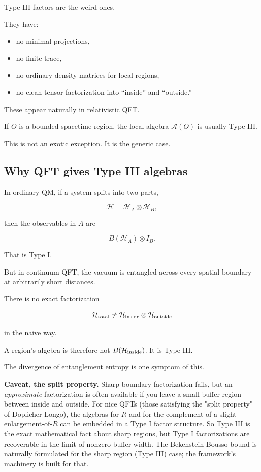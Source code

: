 \documentclass[11pt,a4paper]{article}
\begin{document}
Type III factors are the weird ones.

They have:

\begin{itemize}
  \item no minimal projections,
  \item no finite trace,
  \item no ordinary density matrices for local regions,
  \item no clean tensor factorization into “inside” and “outside.”
\end{itemize}

These appear naturally in relativistic QFT.

If $O$ is a bounded spacetime region, the local algebra $\mathcal{A}(O)$ is usually Type III.

This is not an exotic exception. It is the generic case.

\subsection{Why QFT gives Type III algebras}

In ordinary QM, if a system splits into two parts,

\[
\mathcal{H}=\mathcal{H}_A\otimes\mathcal{H}_B,
\]

then the observables in $A$ are

\[
B(\mathcal{H}_A)\otimes I_B.
\]

That is Type I.

But in continuum QFT, the vacuum is entangled across every spatial boundary at arbitrarily short distances.

There is no exact factorization

\[
\mathcal{H}_{\rm total}
\neq
\mathcal{H}_{\rm inside}\otimes \mathcal{H}_{\rm outside}
\]

in the naive way.

A region's algebra is therefore not $B(\mathcal{H}_{\rm inside})$. It is Type III.

The divergence of entanglement entropy is one symptom of this.

\textbf{Caveat, the split property.} Sharp-boundary factorization fails, but an \emph{approximate} factorization is often available if you leave a small buffer region between inside and outside. For nice QFTs (those satisfying the "split property" of Doplicher-Longo), the algebras for $R$ and for the complement-of-a-slight-enlargement-of-$R$ can be embedded in a Type I factor structure. So Type III is the exact mathematical fact about sharp regions, but Type I factorizations are recoverable in the limit of nonzero buffer width. The Bekenstein-Bousso bound is naturally formulated for the sharp region (Type III) case; the framework's machinery is built for that.
\end{document}
